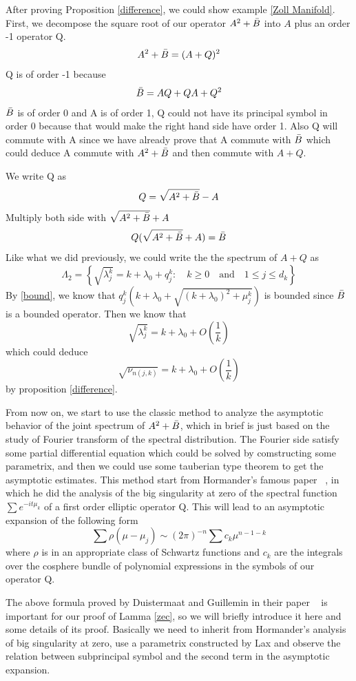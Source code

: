 \documentclass[10pt]{amsart}
\newcommand{\1}{\mathbb{1}}
\begin{document}
After proving Proposition \ref{difference}, we could show example \ref{Zoll Manifold}. First, we decompose the square root of our operator $A^2 + \Bar{B}$ into $A$ plus an order -1 operator Q.
\[
A^2 + \Bar{B} = (A + Q)^2
\]
Q is of order -1 because
\[
\Bar{B}= AQ + QA + Q^2
\]
$\Bar{B}$ is of order 0 and A is of order 1, Q could not have its principal symbol in order 0 because that would make the right hand side have order 1. Also Q will commute with A since we have already prove that A commute with $\Bar{B}$ which could deduce A commute with $A^2 + \Bar{B}$ and then commute with $A + Q$.

We write Q as
\[
Q = \sqrt{A^2 + \Bar{B}} -  A
\]
Multiply both side with $\sqrt{A^2 + \Bar{B}} + A$
\begin{equation}\label{bound}
Q ( \sqrt{A^2 + \Bar{B}}  + A )= \Bar{B}
\end{equation}
Like what we did previously, we could write the the spectrum of $A + Q$ as 
\[
\Lambda_2 = \left\{ \sqrt{\lambda_j^k} = k+\lambda_0 + q_j^k: \quad k \geq 0 \quad \textrm{and} \quad 1 \leq j \leq d_k \right\}
\]
By \eqref{bound}, we know that $q_j^k(k+\lambda_0+\sqrt{(k+\lambda_0)^2+\mu_j^k})$ is bounded since $\Bar{B}$ is a bounded operator. Then we know that
\[
\sqrt{\lambda_j^k} = k+\lambda_0 + O(\frac{1}{k})
\]
which could deduce
\[
\sqrt{\nu_{n(j,k)}} = k+\lambda_0 + O(\frac{1}{k}) 
\]
by proposition \ref{difference}.



From now on, we start to use the classic method to analyze the asymptotic behavior of the joint spectrum of $A^2 + \Bar{B}$, which in brief is just based on the study of Fourier transform of the spectral distribution. The Fourier side satisfy some partial differential equation which could be solved by comstructing some parametrix, and then we could use some tauberian type theorem to get the asymptotic estimates. This method start from Hormander's famous paper ~\cite{Hor68}, in which he did the analysis of the big singularity at zero of the spectral function $\sum e^{-it\mu_k}$ of a first order elliptic operator Q. This will lead to an asymptotic expansion of the following form 
\[
\sum \rho(\mu - \mu_j) \sim (2\pi)^{-n} \sum c_k\mu^{n-1-k}
\]
where $\rho$ is in an appropriate class of Schwartz functions and $c_k$ are the integrals over the cosphere bundle of polynomial expressions in the symbols of our operator Q. 

The above formula proved by Duistermaat and Guillemin in their paper ~\cite{DuistermaatGuillemin} is important for our proof of Lamma \ref{zec}, so we will briefly introduce it here and some details of its proof. Basically we need to inherit from Hormander's analysis of big singularity at zero, use a parametrix constructed by Lax and observe the relation between subprincipal symbol and the second term in the asymptotic expansion.
\end{document}
